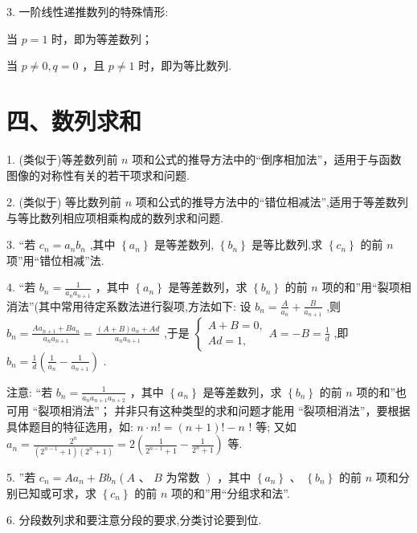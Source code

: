3. 一阶线性递推数列的特殊情形:

  当 $p = 1$ 时，即为等差数列；

  当 $p \neq  0,q = 0$ ，且 $p \neq  1$ 时，即为等比数列.

\section*{四、数列求和}

1. (类似于)等差数列前 $n$ 项和公式的推导方法中的“倒序相加法”，适用于与函数图像的对称性有关的若干项求和问题.

2. (类似于) 等比数列前 $n$ 项和公式的推导方法中的“错位相减法”,适用于等差数列与等比数列相应项相乘构成的数列求和问题.

3. “若 ${c}_{n} = {a}_{n}{b}_{n}$ ,其中 $\left\{  {a}_{n}\right\}$ 是等差数列, $\left\{  {b}_{n}\right\}$ 是等比数列,求 $\left\{  {c}_{n}\right\}$ 的前 $n$ 项”用“错位相减”法.

4. “若 ${b}_{n} = \frac{1}{{a}_{n}{a}_{n + 1}}$ ，其中 $\left\{  {a}_{n}\right\}$ 是等差数列，求 $\left\{  {b}_{n}\right\}$ 的前 $n$ 项的和”用“裂项相消法”(其中常用待定系数法进行裂项,方法如下: 设 ${b}_{n} = \frac{A}{{a}_{n}} + \frac{B}{{a}_{n + 1}}$ ,则 ${b}_{n} = \frac{A{a}_{n + 1} + B{a}_{n}}{{a}_{n}{a}_{n + 1}} = \frac{\left( {A + B}\right) {a}_{n} + {Ad}}{{a}_{n}{a}_{n + 1}}$ ,于是 $\left\{  {\begin{array}{l} A + B = 0, \\  {Ad} = 1, \end{array}A =  - B = }\right.  \frac{1}{d}$ ,即 ${b}_{n} = \frac{1}{d}\left( {\frac{1}{{a}_{n}} - \frac{1}{{a}_{n + 1}}}\right)$ .

注意:   “若 ${b}_{n} = \frac{1}{{a}_{n}{a}_{n + 1}{a}_{n + 2}}$ ，其中 $\left\{  {a}_{n}\right\}$ 是等差数列，求 $\left\{  {b}_{n}\right\}$ 的前 $n$ 项的和”也可用 “裂项相消法”；    并非只有这种类型的求和问题才能用 “裂项相消法”，要根据具体题目的特征选用，如: $n \cdot  n! = \left( {n + 1}\right) !  - n$ ! 等; 又如 ${a}_{n} = \frac{{2}^{n}}{\left( {{2}^{n - 1} + 1}\right) \left( {{2}^{n} + 1}\right) } = 2\left( {\frac{1}{{2}^{n - 1} + 1} - \frac{1}{{2}^{n} + 1}}\right)$ 等.

5. ”若 ${c}_{n} = A{a}_{n} + B{b}_{n}\left( {A\text{ 、 }B\text{ 为常数 }}\right)$ ，其中 $\left\{  {a}_{n}\right\}$ 、 $\left\{  {b}_{n}\right\}$ 的前 $n$ 项和分别已知或可求，求 $\left\{  {c}_{n}\right\}$ 的前 $n$ 项的和”用“分组求和法”.

6. 分段数列求和要注意分段的要求,分类讨论要到位.

